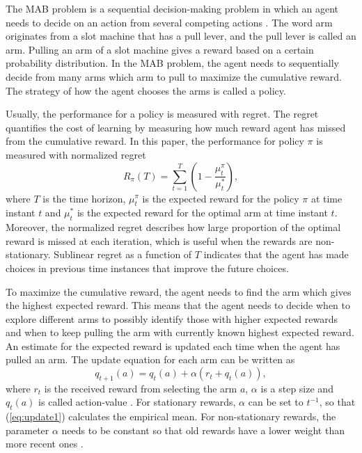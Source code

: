 \documentclass[conference]{IEEEtran}
\begin{document}
The MAB problem is a sequential decision-making problem in which an agent needs to decide on an action from several competing actions \cite{rl_intro}.
The word arm originates from a slot machine that has a pull lever, and the pull lever is called an arm.
Pulling an arm of a slot machine gives a reward based on a certain probability distribution.
In the MAB problem, the agent needs to sequentially decide from many arms which arm to pull to maximize the cumulative reward.
The strategy of how the agent chooses the arms is called a policy.

Usually, the performance for a policy is measured with regret.
The regret quantifies the cost of learning by measuring how much reward agent has missed from the cumulative reward.
In this paper, the performance for policy $\pi$ is measured with normalized regret
\begin{equation}\label{eq:reg}
    R_\pi(T) = \sum_{t=1}^T \left( 1 - \frac{\mu^\pi_t}{\mu^*_t} \right),
\end{equation}
where $T$ is the time horizon, $\mu^\pi_t$ is the expected reward for the policy $\pi$ at time instant $t$ and $\mu_t^*$ is the expected reward for the optimal arm at time instant $t$.
Moreover, the normalized regret describes how large proportion of the optimal reward is missed at each iteration, which is useful when the rewards are non-stationary.
Sublinear regret as a function of $T$ indicates that the agent has made choices in previous time instances that improve the future choices.

To maximize the cumulative reward, the agent needs to find the arm which gives the highest expected reward.
This means that the agent needs to decide when to explore different arms to possibly identify those with higher expected rewards 
and when to keep pulling the arm with currently known highest expected reward.
An estimate for the expected reward is updated each time when the agent has pulled an arm.
The update equation for each arm can be written as
\begin{equation}\label{eq:update1}
    q_{t+1}(a) = q_{t}(a) + \alpha \left(r_t + q_{t}(a)\right),
\end{equation}
where $r_t$ is the received reward from selecting the arm $a$, $\alpha$ is a step size and $q_{t}(a)$ is called action-value \cite{rl_intro}.
For stationary rewards, $\alpha$ can be set to $t^{-1}$, so that (\ref{eq:update1}) calculates the empirical mean. 
For non-stationary rewards, the parameter $\alpha$ needs to be constant so that old rewards have a lower weight than more recent ones \cite{rl_intro}.
\end{document}
